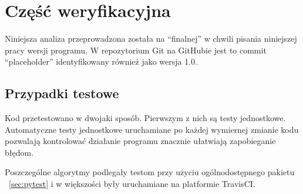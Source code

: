 \section[Weryfikacja]{Część weryfikacyjna}\label{sec:verification} %
    Niniejsza analiza przeprowadzona została na ``finalnej'' w chwili pisania
    niniejszej pracy wersji programu.  W repozytorium Git na GitHubie jest to
    commit ``placeholder''  identyfikowany
    również jako wersja 1.0.

    \subsection{Przypadki testowe}

    Kod przetestowano w dwojaki sposób. Pierwszym z nich są testy jednostkowe.
    Automatyczne testy jednostkowe uruchamiane po każdej wymiernej zmianie kodu
    pozwalają kontrolować działanie programu znacznie ułatwiają zapobieganie
    błędom.

    Poszczególne algorytmy podlegały testom przy użyciu ogólnodostępnego
    pakietu ~\ref{sec:pytest} i w większości były
    uruchamiane na platformie TravisCI\@.

